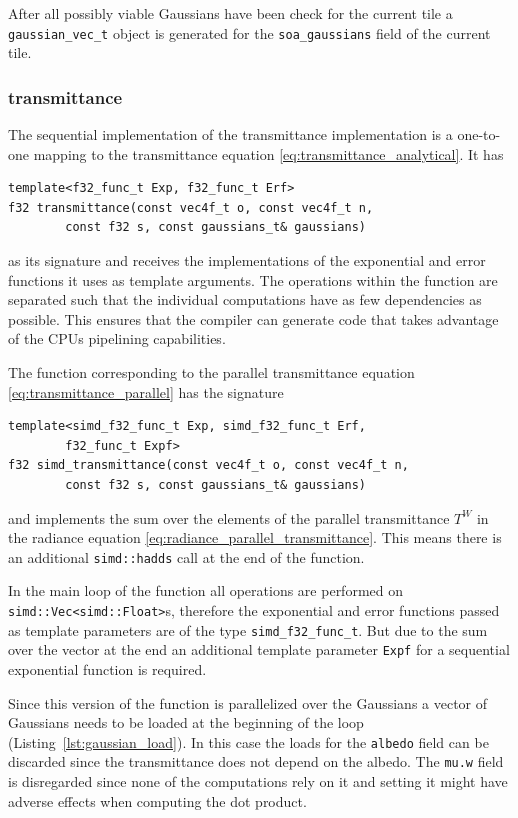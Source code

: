 \documentclass[a4paper, 11pt]{memoir}
\begin{document}
    After all possibly viable Gaussians have been check for the current tile a \texttt{gaussian_vec_t} object
    is generated for the \texttt{soa_gaussians} field of the current tile.

    \subsubsection{\gls{transmittance}}
    The sequential implementation of the \gls{transmittance} implementation is a one-to-one mapping to the
    \gls{transmittance} equation \eqref{eq:transmittance_analytical}. It has
    \begin{verbatim}
template<f32_func_t Exp, f32_func_t Erf>
f32 transmittance(const vec4f_t o, const vec4f_t n,
        const f32 s, const gaussians_t& gaussians)
    \end{verbatim}
    as its signature and receives the implementations of the exponential and error functions it uses as template
    arguments. The operations within the function are separated such that the individual computations have as few
    dependencies as possible. This ensures that the compiler can generate code that takes advantage of the CPUs
    \gls{pipelining} capabilities.
    
    The function corresponding to the parallel \gls{transmittance} equation \eqref{eq:transmittance_parallel} has the
    signature
    \begin{verbatim}
template<simd_f32_func_t Exp, simd_f32_func_t Erf,
        f32_func_t Expf>
f32 simd_transmittance(const vec4f_t o, const vec4f_t n,
        const f32 s, const gaussians_t& gaussians)
    \end{verbatim}
    and implements the sum over the elements of the parallel \gls{transmittance} $T^W$ in the \gls{radiance} equation
    \eqref{eq:radiance_parallel_transmittance}. This means there is an additional \texttt{simd::hadds} call
    at the end of the function.

    In the main loop of the function all operations are performed on \texttt{simd::Vec<simd::Float>}s, therefore
    the exponential and error functions passed as template parameters are of the type \texttt{simd_f32_func_t}.
    But due to the sum over the vector at the end an additional template parameter \texttt{Expf} for a
    sequential exponential function is required.

    Since this version of the function is parallelized over the Gaussians a vector of Gaussians needs to be loaded at the
    beginning of the loop (Listing~\ref{lst:gaussian_load}). In this case the loads for the \texttt{albedo}
    field can be discarded since the \gls{transmittance} does not depend on the \gls{albedo}. The \texttt{mu.w}
    field is disregarded since none of the computations rely on it and setting it might have adverse effects when
    computing the dot product.
\end{document}

